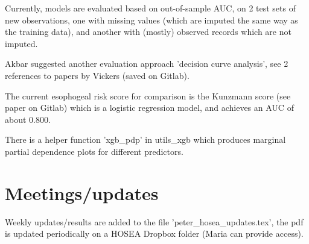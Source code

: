 \documentclass[12pt]{article}
\begin{document}
Currently, models are evaluated based on out-of-sample AUC, on 2 test sets of new observations, one with missing values (which are imputed the same way as the training data), and another with (mostly) observed records which are not imputed.

Akbar suggested another evaluation approach 'decision curve analysis', see 2 references to papers by Vickers (saved on Gitlab).

The current esophogeal risk score for comparison is the Kunzmann score (see paper on Gitlab) which is a logistic regression model, and achieves an AUC of about 0.800.

There is a helper function 'xgb\_pdp' in utils\_xgb which produces marginal partial dependence plots for different predictors.

\section*{Meetings/updates}

Weekly updates/results are added to the file 'peter\_hosea\_updates.tex', the pdf is updated periodically on a HOSEA Dropbox folder (Maria can provide access).

%
\end{document}
